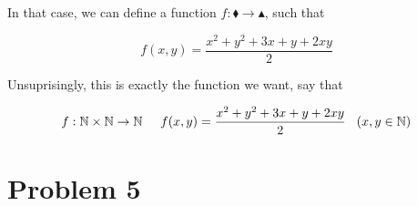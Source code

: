 \documentclass[12pt]{article}
\begin{document}
In that case, we can define a function $ f: \blacklozenge \rightarrow
\blacktriangle $, such that

\[ f(x,y) = \frac{x^2+y^2+3x+y+2xy}{2}\]

\vspace*{0.3cm}
Unsuprisingly, this is exactly the function we want, say that

\[ f: \mathbb{N}\times\mathbb{N} \rightarrow \mathbb{N} 
\hspace*{0.5cm} f(x,y) = \frac{x^2+y^2+3x+y+2xy}{2}
\hspace*{0.3cm} ( x,y \in \mathbb{N}) \]

\newpage
\section*{Problem 5}
\end{document}
